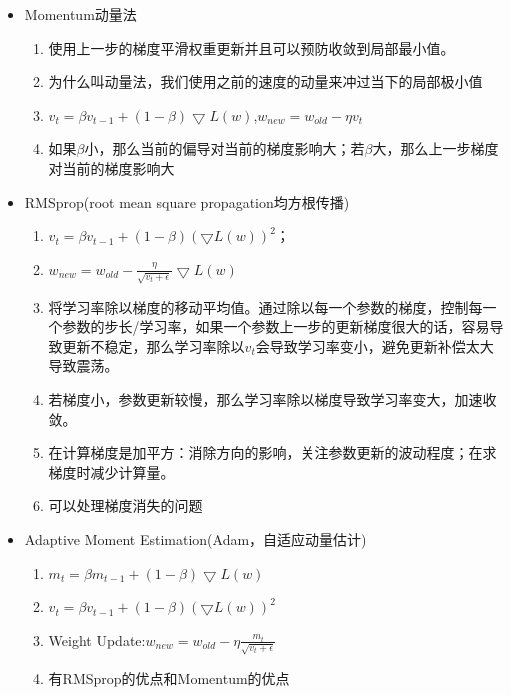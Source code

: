 \documentclass[UTF8]{ctexart}
\begin{document}
\begin{itemize}
\begin{itemize}
\begin{enumerate}
\begin{itemize}
            \item Momentum动量法
            
            \begin{enumerate}
                \item 使用上一步的梯度平滑权重更新并且可以预防收敛到局部最小值。
                \item 为什么叫动量法，我们使用之前的速度的动量来冲过当下的局部极小值
                \item $v_{t}=\beta v_{t-1}+(1-\beta)\bigtriangledown L(w)$,$w_{new}=w_{old}-\eta v_{t}$
                \item 如果$\beta$小，那么当前的偏导对当前的梯度影响大；若$\beta$大，那么上一步梯度对当前的梯度影响大
            \end{enumerate}

            \item RMSprop(root mean square propagation均方根传播)
            
            \begin{enumerate}
                \item $v_{t}=\beta v_{t-1}+(1-\beta) (\bigtriangledown L(w))^2$；
                \item $w_{new}=w_{old}-\frac{\eta}{\sqrt{v_{t}+\epsilon }}\bigtriangledown L(w)$
                \item 将学习率除以梯度的移动平均值。通过除以每一个参数的梯度，控制每一个参数的步长/学习率，如果一个参数上一步的更新梯度很大的话，容易导致更新不稳定，那么学习率除以$v_t$会导致学习率变小，避免更新补偿太大导致震荡。
                \item 若梯度小，参数更新较慢，那么学习率除以梯度导致学习率变大，加速收敛。
                \item 在计算梯度是加平方：消除方向的影响，关注参数更新的波动程度；在求梯度时减少计算量。
                \item 可以处理梯度消失的问题
            \end{enumerate}

            \item  Adaptive Moment Estimation(Adam，自适应动量估计)
            \begin{enumerate}
                \item $m_{t}=\beta m_{t-1}+(1-\beta)\bigtriangledown L(w)$
                \item $v_{t}=\beta v_{t-1}+(1-\beta)(\bigtriangledown L(w))^2$
                \item Weight Update:$w_{new}=w_{old}-\eta\frac{m_{t}}{\sqrt{v_{t}+\epsilon}}$
                \item 有RMSprop的优点和Momentum的优点
            \end{enumerate}


\end{itemize}
\end{enumerate}
\end{itemize}
\end{itemize}
\end{document}
